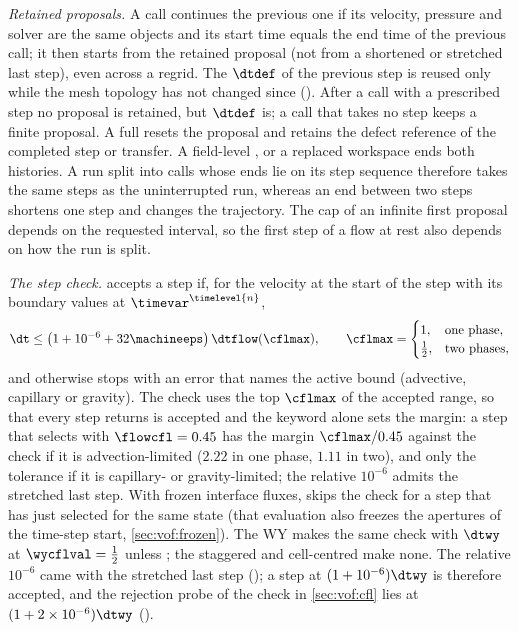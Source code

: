 \emph{Retained proposals.} A call continues the previous one if its
velocity, pressure and solver are the same objects and its start time equals
the end time of the previous call; it then starts from the retained proposal
(not from a shortened or stretched last step), even across a regrid. The
$\dtdef$ of the previous step is reused only while the mesh topology has not
changed since ().
After a call with a prescribed step no proposal is retained, but $\dtdef$
is; a call that takes no step keeps a finite proposal. A full
 resets the proposal and retains the defect
reference of the completed step or transfer. A field-level ,
 or a replaced workspace ends both histories.
A run split into calls whose ends lie on its step sequence therefore takes the
same steps as the uninterrupted run, whereas an end
between two steps shortens one step and changes the trajectory. The cap of
an infinite first proposal depends on the requested interval, so the first
step of a flow at rest also depends on how the run is split.

\emph{The step check.}  accepts a step if, for the velocity
at the start of the step with its boundary values at
$\timevar^{\timelevel{n}}$,
\begin{equation}\label{eq:stab:check}
  \dt\le\roundpar{1+10^{-6}+32\machineeps}\dtflow(\cflmax),\qquad
  \cflmax=\begin{cases}1,&\text{one phase},\\\half,&\text{two phases},\end{cases}
\end{equation}
and otherwise stops with an error that names the active bound (advective,
capillary or gravity). The check uses the top $\cflmax$ of the accepted
 range, so that every step  returns is
accepted and the keyword alone sets the margin: a step that 
selects with $\flowcfl=0.45$ has the margin $\cflmax/0.45$ against the check
if it is advection-limited ($2.22$ in one phase, $1.11$ in two), and only
the tolerance if it is capillary- or gravity-limited; the relative $10^{-6}$
admits the stretched
last step. With frozen interface fluxes,  skips the check for a
step that  has just selected for the same state (that
evaluation also freezes the apertures of the time-step start,
\cref{sec:vof:frozen}). The WY  makes the same check with
$\dtwy$ at $\wycflval=\half$ unless ; the
staggered and cell-centred  make none. The relative
$10^{-6}$ came with the stretched last step (); a step at
$(1+10^{-6})\dtwy$ is therefore accepted, and the rejection probe of the
check in \cref{sec:vof:cfl} lies at $(1+2\times10^{-6})\dtwy$ ().

